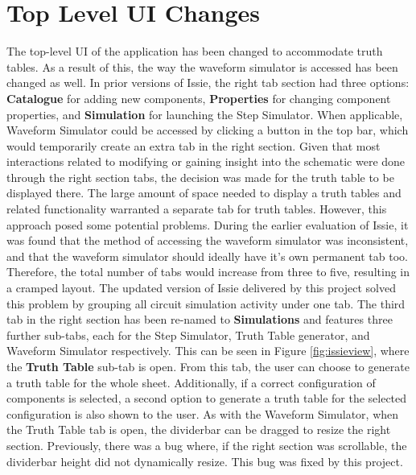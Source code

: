 
\section{Top Level UI Changes}
The top-level UI of the application has been changed to accommodate truth tables. As a result of this, the way the waveform simulator is accessed has been changed as well. In prior versions of Issie, the right tab section had three options: \textbf{Catalogue} for adding new components, \textbf{Properties} for changing component properties, and \textbf{Simulation} for launching the Step Simulator. When applicable, Waveform Simulator could be accessed by clicking a button in the top bar, which would temporarily create an extra tab in the right section. Given that most interactions related to modifying or gaining insight into the schematic were done through the right section tabs, the decision was made for the truth table to be displayed there. The large amount of space needed to display a truth tables and related functionality warranted a separate tab for truth tables. However, this approach posed some potential problems. During the earlier evaluation of Issie, it was found that the method of accessing the waveform simulator was inconsistent, and that the waveform simulator should ideally have it's own permanent tab too. Therefore, the total number of tabs would increase from three to five, resulting in a cramped layout. 
The updated version of Issie delivered by this project solved this problem by grouping all circuit simulation activity under one tab. The third tab in the right section has been re-named to \textbf{Simulations} and features three further sub-tabs, each for the Step Simulator, Truth Table generator, and Waveform Simulator respectively. This can be seen in Figure \ref{fig:issieview}, where the \textbf{Truth Table} sub-tab is open. 
From this tab, the user can choose to generate a truth table for the whole sheet. Additionally, if a correct configuration of components is selected, a second option to generate a truth table for the selected configuration is also shown to the user. As with the Waveform Simulator, when the Truth Table tab is open, the dividerbar can be dragged to resize the right section. Previously, there was a bug where, if the right section was scrollable, the dividerbar height did not dynamically resize. This bug was fixed by this project.

